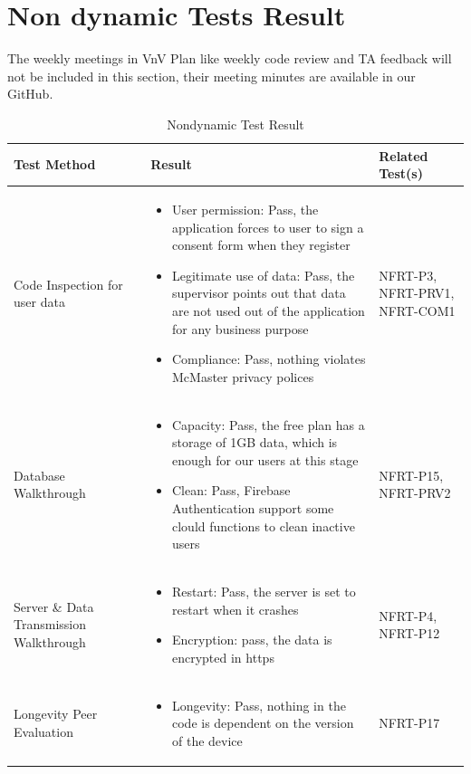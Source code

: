 \documentclass[12pt, titlepage]{article}
\begin{document}
\section{Non dynamic Tests Result}\label{static}
The weekly meetings in VnV Plan like weekly code review and TA feedback will not be included in this section, their meeting minutes are available in our GitHub.
\begin{table}[H]
\caption{Nondynamic Test Result}
\begin{tabular}{|p{0.3\linewidth} | p{0.5\linewidth}| p{0.2\linewidth} |}
\hline
\multicolumn{1}{|l}{\bfseries Test Method} & \multicolumn{1}{|l|}{\bfseries Result} & \multicolumn{1}{l|}{\bfseries Related Test(s)}\\
\hline
Code Inspection for user data & 
\begin{itemize}
\item User permission: Pass, the application forces to user to sign a consent form when they register
\item Legitimate use of data: Pass, the supervisor points out that data are not used out of the application for any business purpose
\item Compliance: Pass, nothing violates McMaster privacy polices
\end{itemize} & NFRT-P3, NFRT-PRV1, NFRT-COM1 \\
\hline
Database Walkthrough & 
\begin{itemize}
\item Capacity: Pass, the free plan has a storage of 1GB data, which is enough for our users at this stage
\item Clean: Pass, Firebase Authentication support some clould functions to clean inactive users
\end{itemize}& NFRT-P15, NFRT-PRV2\\
\hline
Server \& Data Transmission Walkthrough & 
\begin{itemize}
\item Restart: Pass, the server is set to restart when it crashes
\item Encryption: pass, the data is encrypted in https
\end{itemize} & NFRT-P4, NFRT-P12 \\
\hline
Longevity Peer Evaluation & 
\begin{itemize}
\item Longevity: Pass, nothing in the code is dependent on the version of the device
\end{itemize} & NFRT-P17\\
\hline
\end{tabular}
\end{table}
\end{document}
